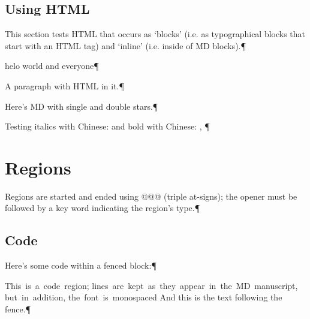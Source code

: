 

\section{Using HTML
}
This section tests HTML that occurs as ‘blocks’ (i.e. as typographical blocks
that start with an HTML tag) and ‘inline’ (i.e. inside of MD blocks).¶\par
helo {\mktsStyleItalic{}world} and {\mktsStyleBold{}everyone}¶\par
A paragraph with {} HTML in it.¶\par
Here’s MD with {\mktsStyleItalic{}single} and {\mktsStyleBold{}double} stars.¶\par
Testing {\mktsStyleItalic{}italics with Chinese: } and {\mktsStyleBold{}bold with Chinese: , }¶\par

\chapter{Regions
}
Regions are started and ended using {\mktsStyleCode{}@@@} (triple at-signs); the opener
must be followed by a key word indicating the region’s type.¶\par

\section{Code
}
Here’s {\mktsStyleCode{}some code} within a fenced block:¶\par
\begingroup\obeyalllines\mktsStyleCode{}This is a code region;
lines are kept as they appear in the MD manuscript,
but in addition,
the font is monospaced
\endgroup{}And this is the text following the fence.¶\par

